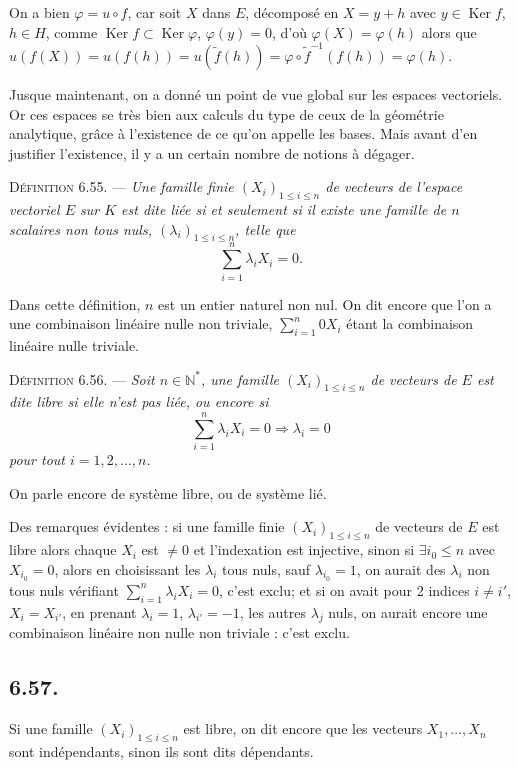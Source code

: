 On a bien $\varphi=u\circ f$, car soit $X$ dans $E$, décomposé en $X=y+h$ avec $y\in\operatorname{Ker}f$, $h\in H$, comme $\operatorname{Ker}f\subset\operatorname{Ker}\varphi$, $\varphi(y)=0$, d'où $\varphi(X)=\varphi(h)$ alors que $u(f(X))=u(f(h))=u(\widetilde f(h))=\varphi\circ\widetilde f^{-1}(f(h))=\varphi(h)$. \bookend


Jusque maintenant, on a donné un point de vue global sur les espaces vectoriels. Or ces espaces se  très bien aux calculs du type de ceux de la géométrie analytique, grâce à l'existence de ce qu'on appelle les bases. Mais avant d'en justifier l'existence, il y a un certain nombre de notions à dégager.

\medskip\noindent\textsc{Définition 6.55.} --- \emph{Une famille finie $(X_i)_{1\le i\le n}$ de vecteurs de l'espace vectoriel $E$ sur $K$ est dite liée si et seulement si il existe une famille de $n$ scalaires non tous nuls, $(\lambda_i)_{1\le i\le n}$, telle que
\[
\sum_{i=1}^n\lambda_iX_i=0.
\]}

Dans cette définition, $n$ est un entier naturel non nul. On dit encore que l'on a une combinaison linéaire nulle non triviale, $\sum_{i=1}^n0X_i$ étant la combinaison linéaire nulle triviale.

\medskip\noindent\textsc{Définition 6.56.} --- \emph{Soit $n\in\mathbb N^*$, une famille $(X_i)_{1\le i\le n}$ de vecteurs de $E$ est dite libre si elle n'est pas liée, ou encore si
\[
\sum_{i=1}^n\lambda_iX_i=0\Longrightarrow\lambda_i=0
\]
pour tout $i=1,2,\ldots,n$.}

On parle encore de système libre, ou de système lié.

Des remarques évidentes : si une famille finie $(X_i)_{1\le i\le n}$ de vecteurs de $E$ est libre alors chaque $X_i$ est $\ne0$ et l'indexation est injective, sinon si $\exists i_0\le n$ avec $X_{i_0}=0$, alors en choisissant les $\lambda_i$ tous nuls, sauf $\lambda_{i_0}=1$, on aurait des $\lambda_i$ non tous nuls vérifiant $\sum_{i=1}^n\lambda_iX_i=0$, c'est exclu; et si on avait pour 2 indices $i\ne i'$, $X_i=X_{i'}$, en prenant $\lambda_i=1$, $\lambda_{i'}=-1$, les autres $\lambda_j$ nuls, on aurait encore une combinaison linéaire non nulle non triviale : c'est exclu.

\subsection*{6.57.}
Si une famille $(X_i)_{1\le i\le n}$ est libre, on dit encore que les vecteurs $X_1,\ldots,X_n$ sont indépendants, sinon ils sont dits dépendants.

